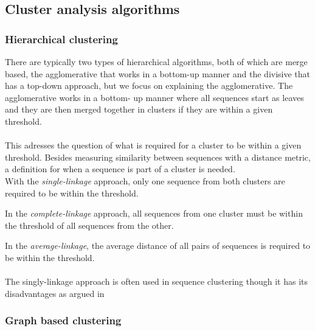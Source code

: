\subsection{Cluster analysis algorithms}

\subsubsection{Hierarchical clustering}
There are typically two types of hierarchical algorithms, both of which are 
merge based, the agglomerative that works in a bottom-up manner and the 
divisive that has a top-down approach, but we focus on explaining the 
agglomerative. The agglomerative works in a bottom-
up manner where all sequences start as leaves and they are then merged 
together in clusters if they are within a given threshold.\\
\\%
This adresses the question of what is required for a cluster to be within a 
given threshold. Besides measuring similarity between sequences with a 
distance metric, a definition for when a sequence is part of a cluster is 
needed. \\

With the \textit{single-linkage} approach, only one sequence from both 
clusters are required to be within the threshold.

In the \textit{complete-linkage} approach, all sequences from one cluster 
must be within the threshold of all sequences from the other.

In the \textit{average-linkage}, the average distance of all pairs of 
sequences is required to be within the threshold.\\
\\
The singly-linkage approach is often used in sequence clustering though it has its disadvantages as argued in \cite[pp. 62-63]{dong}

\subsubsection{Graph based clustering}


